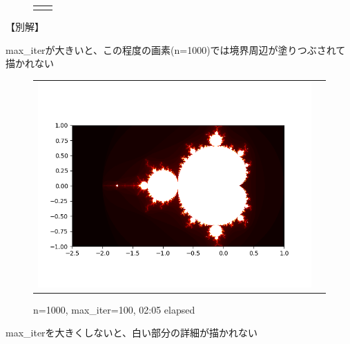 \documentclass[uplatex,a4paper,11pt,oneside,openany]{jsbook}
\begin{document}
\begin{figure}[H]
\begin{tabular}{cc}
\begin{minipage}{0.5\hsize}
      \end{minipage}
    \end{tabular}
\end{figure}%

\newpage

【別解】



\newpage

max\_iterが大きいと、この程度の画素(n=1000)では境界周辺が塗りつぶされて描かれない

\begin{figure}[H]
  \centering
  \begin{tabular}{cc}
      \begin{minipage}{0.9\hsize}
      \centering
\includegraphics[keepaspectratio,clip,scale=0.8]{../src/figure/mandelbrotset0.png}
\caption{n=1000, max\_iter=100, 02:05 elapsed}
      \end{minipage}
      \begin{minipage}{0.1\hsize}
      \centering
      \end{minipage}
    \end{tabular}
\end{figure}%

max\_iterを大きくしないと、白い部分の詳細が描かれない
\end{document}
